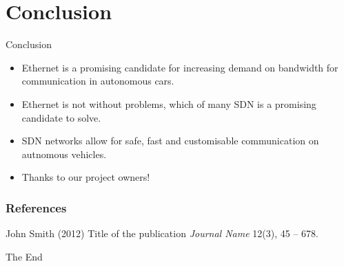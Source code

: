 \documentclass{beamer}
\begin{document}

\section{Conclusion}
\begin{frame}{Conclusion}
    \begin{itemize}
        \item Ethernet is a promising candidate for increasing demand on bandwidth for communication in autonomous cars.
        \item Ethernet is not without problems, which of many SDN is a promising candidate to solve.
        \item SDN networks allow for safe, fast and customisable communication on autnomous vehicles.
        \item Thanks to our project owners! 
    \end{itemize}
    
\end{frame}




\begin{frame}
\frametitle{References}
\footnotesize{
\begin{thebibliography}{99} %
 John Smith (2012)
\newblock Title of the publication
\newblock \emph{Journal Name} 12(3), 45 -- 678.
\end{thebibliography}
}
\end{frame}


\begin{frame}
\Huge{\centerline{The End}}
\end{frame}

\end{document}
